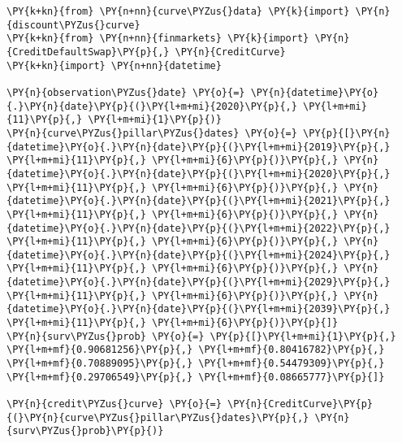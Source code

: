 \begin{Answer}
 \begin{tcolorbox}[size=fbox, boxrule=1pt, pad at break*=1mm,colback=cellbackground, colframe=cellborder]
\begin{Verbatim}[commandchars=\\\{\}]
\PY{k+kn}{from} \PY{n+nn}{curve\PYZus{}data} \PY{k}{import} \PY{n}{discount\PYZus{}curve}
\PY{k+kn}{from} \PY{n+nn}{finmarkets} \PY{k}{import} \PY{n}{CreditDefaultSwap}\PY{p}{,} \PY{n}{CreditCurve}
\PY{k+kn}{import} \PY{n+nn}{datetime}

\PY{n}{observation\PYZus{}date} \PY{o}{=} \PY{n}{datetime}\PY{o}{.}\PY{n}{date}\PY{p}{(}\PY{l+m+mi}{2020}\PY{p}{,} \PY{l+m+mi}{11}\PY{p}{,} \PY{l+m+mi}{1}\PY{p}{)}
\PY{n}{curve\PYZus{}pillar\PYZus{}dates} \PY{o}{=} \PY{p}{[}\PY{n}{datetime}\PY{o}{.}\PY{n}{date}\PY{p}{(}\PY{l+m+mi}{2019}\PY{p}{,} \PY{l+m+mi}{11}\PY{p}{,} \PY{l+m+mi}{6}\PY{p}{)}\PY{p}{,} \PY{n}{datetime}\PY{o}{.}\PY{n}{date}\PY{p}{(}\PY{l+m+mi}{2020}\PY{p}{,} \PY{l+m+mi}{11}\PY{p}{,} \PY{l+m+mi}{6}\PY{p}{)}\PY{p}{,} \PY{n}{datetime}\PY{o}{.}\PY{n}{date}\PY{p}{(}\PY{l+m+mi}{2021}\PY{p}{,} \PY{l+m+mi}{11}\PY{p}{,} \PY{l+m+mi}{6}\PY{p}{)}\PY{p}{,} \PY{n}{datetime}\PY{o}{.}\PY{n}{date}\PY{p}{(}\PY{l+m+mi}{2022}\PY{p}{,} \PY{l+m+mi}{11}\PY{p}{,} \PY{l+m+mi}{6}\PY{p}{)}\PY{p}{,} \PY{n}{datetime}\PY{o}{.}\PY{n}{date}\PY{p}{(}\PY{l+m+mi}{2024}\PY{p}{,} \PY{l+m+mi}{11}\PY{p}{,} \PY{l+m+mi}{6}\PY{p}{)}\PY{p}{,} \PY{n}{datetime}\PY{o}{.}\PY{n}{date}\PY{p}{(}\PY{l+m+mi}{2029}\PY{p}{,} \PY{l+m+mi}{11}\PY{p}{,} \PY{l+m+mi}{6}\PY{p}{)}\PY{p}{,} \PY{n}{datetime}\PY{o}{.}\PY{n}{date}\PY{p}{(}\PY{l+m+mi}{2039}\PY{p}{,} \PY{l+m+mi}{11}\PY{p}{,} \PY{l+m+mi}{6}\PY{p}{)}\PY{p}{]}
\PY{n}{surv\PYZus{}prob} \PY{o}{=} \PY{p}{[}\PY{l+m+mi}{1}\PY{p}{,} \PY{l+m+mf}{0.90681256}\PY{p}{,} \PY{l+m+mf}{0.80416782}\PY{p}{,} \PY{l+m+mf}{0.70889095}\PY{p}{,} \PY{l+m+mf}{0.54479309}\PY{p}{,} \PY{l+m+mf}{0.29706549}\PY{p}{,} \PY{l+m+mf}{0.08665777}\PY{p}{]}

\PY{n}{credit\PYZus{}curve} \PY{o}{=} \PY{n}{CreditCurve}\PY{p}{(}\PY{n}{curve\PYZus{}pillar\PYZus{}dates}\PY{p}{,} \PY{n}{surv\PYZus{}prob}\PY{p}{)}
\end{Verbatim}
\end{tcolorbox}


\end{Answer}
